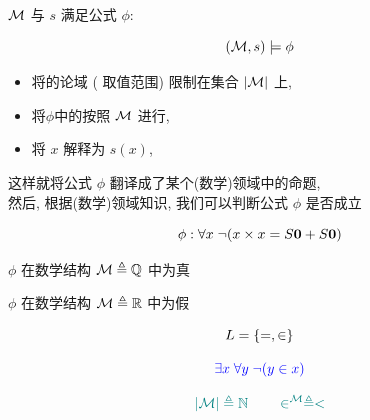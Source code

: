 \begin{frame}{}
  \begin{definition}
    \begin{center}
      $\mathcal{M}$ 与 $s$ 满足公式 $\phi$:
    \end{center}
    \[
      (\mathcal{M}, s) \models \phi
    \]
    \begin{itemize}
      \setlength{\itemsep}{6pt}
      \item 将的论域 ( 取值范围) 限制在集合 $|\mathcal{M}|$ 上,
      \item 将$\phi$中的按照 $\mathcal{M}$ 进行,
      \item 将 $x$ 解释为 $s(x)$,
    \end{itemize}

    \vspace{1em}
    \begin{center}
      这样就将公式 $\phi$ 翻译成了某个(数学)领域中的命题, \\[6pt]
      然后, 根据(数学)领域知识, 我们可以判断公式 $\phi$ 是否成立
    \end{center}
  \end{definition}
\end{frame}

\begin{frame}{}
  \[
    \phi: \forall x\; \lnot (x \times x = S{\bf 0} + S{\bf 0})
  \]

  \pause
  \vspace{0.80cm}
  \begin{center}
    $\phi$ 在数学结构 $\mathcal{M} \triangleq \mathbb{Q}$ 中为真

    \pause
    \vspace{0.60cm}
    $\phi$ 在数学结构 $\mathcal{M} \triangleq \mathbb{R}$ 中为假
  \end{center}
\end{frame}

\begin{frame}{}
  \[
    L = \{=, \in\}
  \]

  \pause
  \[
    \textcolor{blue}{\exists x\; \forall y\; \lnot(y \in x)}
  \]

  \pause
  \[
    \textcolor{teal}{|\mathcal{M}| \triangleq \mathbb{N} \qquad \in^{\mathcal{M}} \triangleq <}
  \]
\end{frame}

